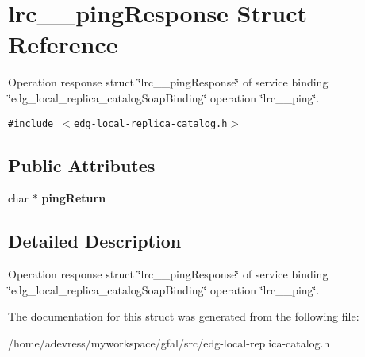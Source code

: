 \section{lrc\_\-\_\-ping\-Response Struct Reference}
\label{structlrc____pingResponse}
Operation response struct \char`\"{}lrc\_\-\_\-ping\-Response\char`\"{} of service binding \char`\"{}edg\_\-local\_\-replica\_\-catalog\-Soap\-Binding\char`\"{} operation \char`\"{}lrc\_\-\_\-ping\char`\"{}.  


{\tt \#include $<$edg-local-replica-catalog.h$>$}

\subsection*{Public Attributes}
\begin{CompactItemize}
\item 
char $\ast$ \textbf{ping\-Return}\label{structlrc____pingResponse_7d280b276562c4041a1accbef019f4cf}

\end{CompactItemize}


\subsection{Detailed Description}
Operation response struct \char`\"{}lrc\_\-\_\-ping\-Response\char`\"{} of service binding \char`\"{}edg\_\-local\_\-replica\_\-catalog\-Soap\-Binding\char`\"{} operation \char`\"{}lrc\_\-\_\-ping\char`\"{}. 



The documentation for this struct was generated from the following file:\begin{CompactItemize}
\item 
/home/adevress/myworkspace/gfal/src/edg-local-replica-catalog.h\end{CompactItemize}
